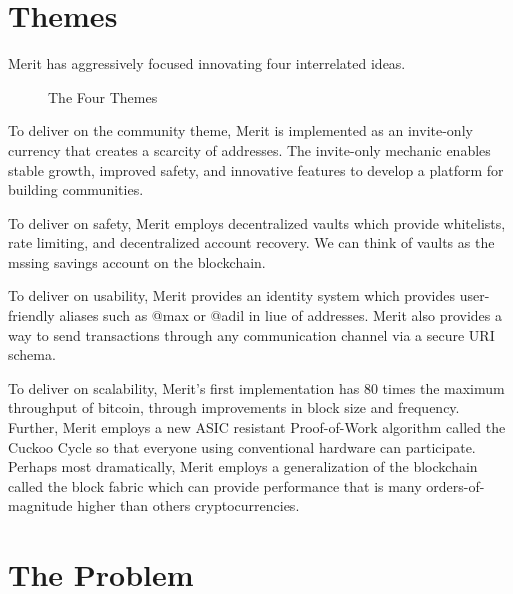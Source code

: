 \documentclass{article}
\begin{document}
\newpage
\section{Themes}
Merit has aggressively focused innovating four interrelated ideas. 

\begin{figure}[H]
    \begin{center}
    \end{center}
    \caption{The Four Themes}

\end{figure}

To deliver on the community theme, Merit is implemented as an invite-only currency that creates a scarcity
of addresses. The invite-only mechanic enables stable growth, improved safety,
and innovative features to develop a platform for building communities.

To deliver on safety, Merit employs decentralized \glspl{vault} which provide whitelists,
rate limiting, and decentralized account recovery.  We can think of vaults as the mssing savings 
account on the blockchain.

To deliver on usability, Merit provides an identity system which provides user-friendly
aliases such as @max or @adil in liue of addresses. Merit also provides a way to send \glspl{transaction} through any
communication channel via a secure URI schema.

To deliver on scalability, Merit's first implementation has 80 times the maximum throughput of bitcoin, through improvements in block size and frequency.  
Further, Merit employs a new ASIC resistant Proof-of-Work algorithm called
the Cuckoo Cycle so that everyone using conventional hardware can participate.
Perhaps most dramatically,
Merit employs a generalization of the blockchain called the \gls{block fabric} 
which can provide performance that is many orders-of-magnitude higher than others cryptocurrencies.

\section{The Problem}
\end{document}

